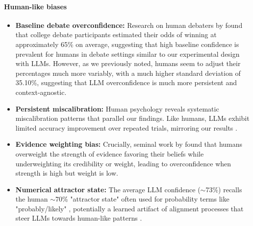 \documentclass{article}
\begin{document}
\paragraph{Human-like biases}
\begin{itemize}
    \item \textbf{Baseline debate overconfidence:} Research on human debaters by \citet{RePEc:sip:dpaper:06-042} found that college debate participants estimated their odds of winning at approximately 65\% on average, suggesting that high baseline confidence is prevalent for humans in debate settings similar to our experimental design with LLMs. However, as we previously noted, humans seem to adjust their percentages much more variably, with a much higher standard deviation of 35.10\%, suggesting that LLM overconfidence is much more persistent and context-agnostic.

    \item \textbf{Persistent miscalibration:} Human psychology reveals systematic miscalibration patterns that parallel our findings. Like humans, LLMs exhibit limited accuracy improvement over repeated trials, mirroring our results \citep{Moore2008}.

    \item \textbf{Evidence weighting bias:} Crucially, seminal work by \citet{GriffinTversky1992} found that humans overweight the strength of evidence favoring their beliefs while underweighting its credibility or weight, leading to overconfidence when strength is high but weight is low.

    \item \textbf{Numerical attractor state:} The average LLM confidence ($\sim$73\%) recalls the human $\sim$70\% "attractor state" often used for probability terms like "probably/likely" \citep{Hashim2024,Mandel2019}, potentially a learned artifact of alignment processes that steer LLMs towards human-like patterns \citep{west2025basemodelsbeataligned}.
\end{itemize}
\end{document}
